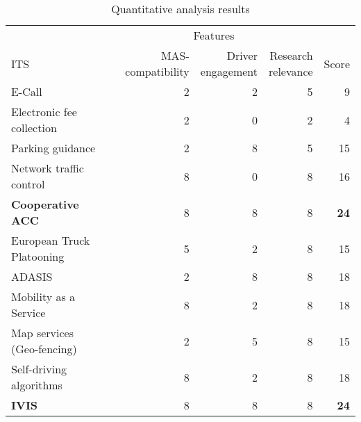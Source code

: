 \documentclass[main.tex]{subfiles}
\begin{document}
\begin{table}[htbp]
    \caption{Quantitative analysis results}
    \renewcommand{\arraystretch}{1.4}
    \centering\begin{tabular}{l*{3}{r}r} \toprule
         & \multicolumn{3}{c}{Features} & \\ \cmidrule(rl){2-4}
        ITS & \multicolumn{1}{p{6em}}{MAS-compatibility} & \multicolumn{1}{p{6em}}{Driver \newline engagement} & \multicolumn{1}{p{6em}}{Research \newline relevance} & Score \\ \midrule
        E-Call & 2 & 2 & 5 & 9 \\ 
        Electronic fee collection & 2 & 0 & 2 & 4 \\
        Parking guidance & 2 & 8 & 5 & 15 \\
        Network traffic control & 8 & 0 & 8 & 16 \\
        \textbf{Cooperative ACC} & 8 & 8 & 8 & \textbf{24} \\
        European Truck Platooning & 5 & 2 & 8 & 15 \\
        ADASIS & 2 & 8 & 8 & 18 \\
        Mobility as a Service & 8 & 2 & 8 & 18 \\
        Map services (Geo-fencing) & 2 & 5 & 8 & 15 \\
        \multicolumn{1}{p{5em}}{Self-driving algorithms} \& Platooning & 8 & 2 & 8 & 18 \\
        \textbf{IVIS} & 8 & 8 & 8 & \textbf{24} \\ \bottomrule
    \end{tabular}
    \label{qa-table}
\end{table}
\clearpage 
\end{document}
